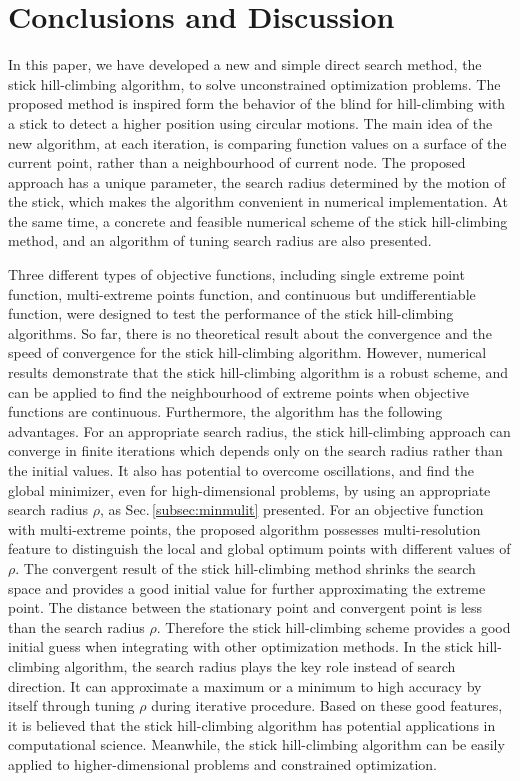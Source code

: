 \documentclass[mathpazo]{aamm}
\begin{document}
\section{Conclusions and Discussion}
\label{sec:conclusion}

In this paper, we have developed a new and simple direct search
method, the stick hill-climbing algorithm, to solve unconstrained
optimization problems. 
The proposed method is inspired form the behavior of the blind for
hill-climbing with a stick to detect a higher position using circular motions.    
The main idea of the new algorithm, at each iteration, is
comparing function values on a surface of the current point,
rather than a neighbourhood of current node. 
The proposed approach has a unique parameter, the search radius
determined by the motion of the stick, which makes
the algorithm convenient in numerical implementation.
At the same time, a concrete and feasible numerical
scheme of the stick hill-climbing method, and an algorithm of tuning search radius are also presented.

Three different types of objective functions,
including single extreme point function, multi-extreme points
function, and continuous but undifferentiable function, 
were designed to test the performance of the stick hill-climbing algorithms.
So far, there is no theoretical result about the convergence and
the speed of convergence for the stick hill-climbing algorithm. 
However, numerical results demonstrate that the stick hill-climbing algorithm is
a robust scheme, and can be applied to find the neighbourhood of
extreme points when objective functions are continuous.
Furthermore, the algorithm has the following advantages. 
For an appropriate search radius, the stick hill-climbing approach can
converge in finite iterations which depends only on the search
radius rather than the initial values.
It also has potential to overcome oscillations, and find the global
minimizer, even for high-dimensional problems, by using
an appropriate search radius $\rho$, as
Sec.\,\ref{subsec:minmulit} presented. 
For an objective function with multi-extreme points, 
the proposed algorithm possesses multi-resolution
feature to distinguish the local and global optimum points  
with different values of $\rho$.
The convergent result of the stick hill-climbing method shrinks the search space and
provides a good initial value for further approximating the
extreme point. The distance between the stationary point and
convergent point is less than the search radius $\rho$. 
Therefore the stick hill-climbing scheme provides a good initial guess when
integrating with other optimization methods.
In the stick hill-climbing algorithm, the search radius plays the key role  instead of search direction.
It can approximate a maximum or a minimum to high
accuracy by itself through tuning $\rho$ during iterative procedure. 
Based on these good features, it is believed that the stick
hill-climbing algorithm has potential applications in computational science.
Meanwhile, the stick hill-climbing algorithm can be easily applied
to higher-dimensional problems and constrained optimization.
\end{document}
